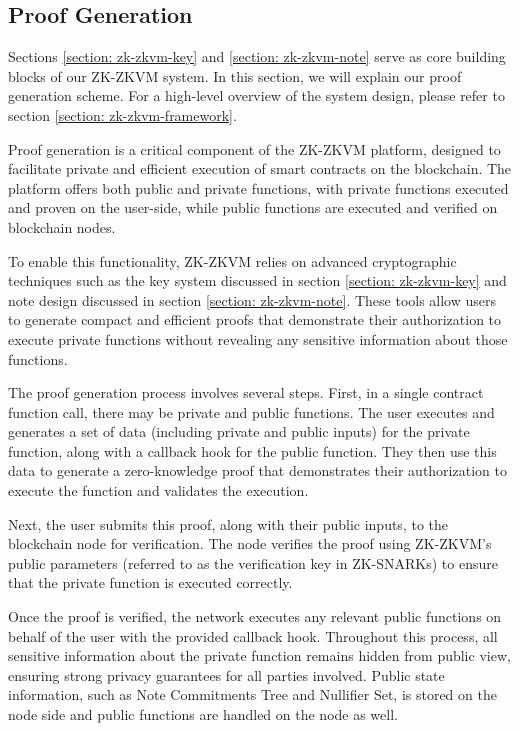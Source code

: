 \subsection{Proof Generation}\label{section: zk-zkvm-user-end-prove}

Sections \ref{section: zk-zkvm-key} and \ref{section: zk-zkvm-note} serve as core building blocks of our ZK-ZKVM system. In this section, we will explain our proof generation scheme. For a high-level overview of the system design, please refer to section \ref{section: zk-zkvm-framework}.

Proof generation is a critical component of the ZK-ZKVM platform, designed to facilitate private and efficient execution of smart contracts on the blockchain. The platform offers both public and private functions, with private functions executed and proven on the user-side, while public functions are executed and verified on blockchain nodes.

To enable this functionality, ZK-ZKVM relies on advanced cryptographic techniques such as the key system discussed in section \ref{section: zk-zkvm-key} and note design discussed in section \ref{section: zk-zkvm-note}. These tools allow users to generate compact and efficient proofs that demonstrate their authorization to execute private functions without revealing any sensitive information about those functions.

The proof generation process involves several steps. First, in a single contract function call, there may be private and public functions. The user executes and generates a set of data (including private and public inputs) for the private function, along with a callback hook for the public function. They then use this data to generate a zero-knowledge proof that demonstrates their authorization to execute the function and validates the execution.

Next, the user submits this proof, along with their public inputs, to the blockchain node for verification. The node verifies the proof using ZK-ZKVM's public parameters (referred to as the verification key in ZK-SNARKs) to ensure that the private function is executed correctly.

Once the proof is verified, the network executes any relevant public functions on behalf of the user with the provided callback hook. Throughout this process, all sensitive information about the private function remains hidden from public view, ensuring strong privacy guarantees for all parties involved. Public state information, such as Note Commitments Tree and Nullifier Set, is stored on the node side and public functions are handled on the node as well.
